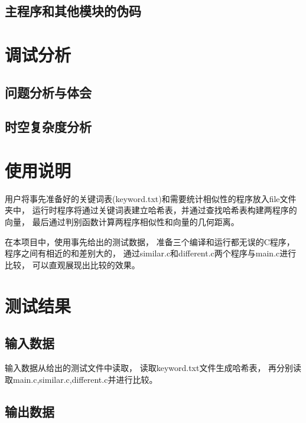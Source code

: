 \documentclass[a4paper]{article}
\begin{document}
    \subsection{主程序和其他模块的伪码}\label{subsec:code2}


    \section{调试分析}\label{sec:debug}

    \subsection{问题分析与体会}\label{subsec:analysis}

    \subsection{时空复杂度分析}\label{subsec:analysis2}


    \section{使用说明}\label{sec:instrut}
    {{用户将事先准备好的关键词表(keyword.txt)和需要统计相似性的程序放入file文件夹中，
    运行时程序将通过关键词表建立哈希表，并通过查找哈希表构建两程序的向量，
    最后通过判别函数计算两程序相似性和向量的几何距离。}}

    {{在本项目中，使用事先给出的测试数据，
    准备三个编译和运行都无误的C程序，程序之间有相近的和差别大的，
    通过similar.c和different.c两个程序与main.c进行比较，
    可以直观展现出比较的效果。}}


    \section{测试结果}\label{sec:result}

    \subsection{输入数据}\label{subsec:in}
    {{输入数据从给出的测试文件中读取，
    读取keyword.txt文件生成哈希表，
    再分别读取main.c,similar.c,different.c并进行比较。}}

    \subsection{输出数据}\label{subsec:out}
\end{document}
